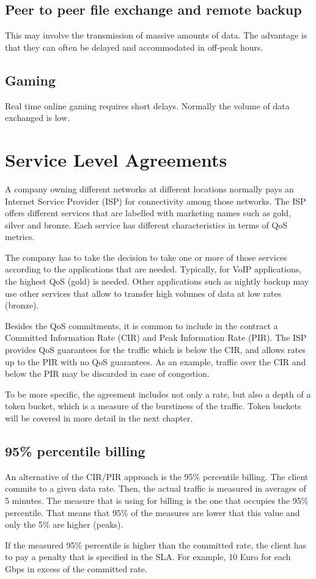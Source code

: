 \subsection{Peer to peer file exchange and remote backup}
This may involve the transmission of massive amounts of data.
The advantage is that they can often be delayed and accommodated in off-peak hours.

\subsection{Gaming}
Real time online gaming requires short delays.
Normally the volume of data exchanged is low.

\section{Service Level Agreements}

A company owning different networks at different locations normally pays an Internet Service Provider (ISP) for connectivity among those networks.
The ISP offers different services that are labelled with marketing names such as gold, silver and bronze.
Each service has different characteristics in terms of QoS metrics.

The company has to take the decision to take one or more of those services according to the applications that are needed.
Typically, for VoIP applications, the highest QoS (gold) is needed.
Other applications such as nightly backup may use other services that allow to transfer high volumes of data at low rates (bronze).

Besides the QoS commitments, it is common to include in the contract a Committed Information Rate (CIR) and Peak Information Rate (PIR).
The ISP provides QoS guarantees for the traffic which is below the CIR, and allows rates up to the PIR with no QoS guarantees.
As an example, traffic over the CIR and below the PIR may be discarded in case of congestion.

To be more specific, the agreement includes not only a rate, but also a depth of a token bucket, which is a measure of the burstiness of the traffic. 
Token buckets will be covered in more detail in the next chapter.

\subsection{95\% percentile billing}

An alternative of the CIR/PIR approach is the 95\% percentile billing.
The client commits to a given data rate.
Then, the actual traffic is measured in averages of 5 minutes.
The measure that is using for billing is the one that occupies the 95\% percentile.
That means that 95\% of the measures are lower that this value and only the 5\% are higher (peaks).

If the measured 95\% percentile is higher than the committed rate, the client has to pay a penalty that is specified in the SLA.
For example, 10 Euro for each Gbps in excess of the committed rate.
